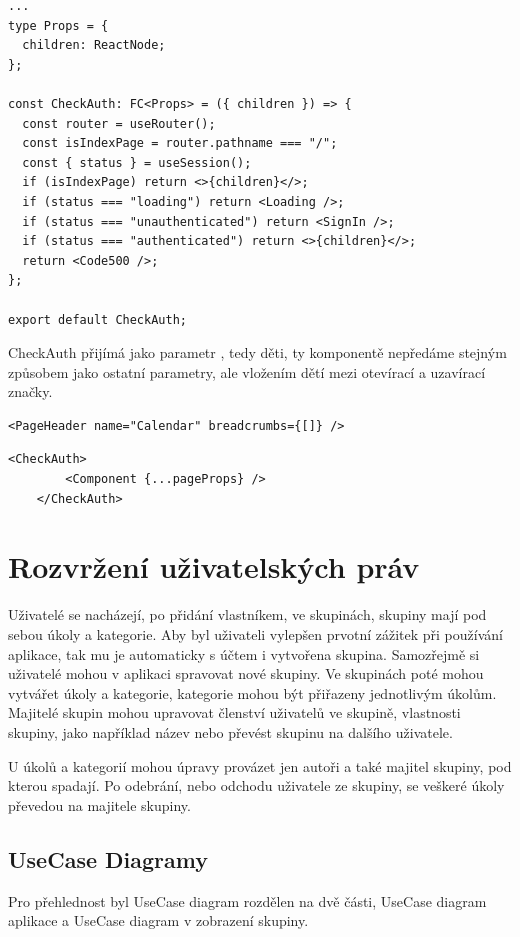 \begin{lstlisting}[caption=Komponenta CheckAuth]
...
type Props = {
  children: ReactNode;
};

const CheckAuth: FC<Props> = ({ children }) => {
  const router = useRouter();
  const isIndexPage = router.pathname === "/";
  const { status } = useSession();
  if (isIndexPage) return <>{children}</>;
  if (status === "loading") return <Loading />;
  if (status === "unauthenticated") return <SignIn />;
  if (status === "authenticated") return <>{children}</>;
  return <Code500 />;
};

export default CheckAuth;

\end{lstlisting}
CheckAuth přijímá jako parametr , tedy děti, ty komponentě nepředáme stejným způsobem jako ostatní parametry, ale vložením dětí mezi otevírací a uzavírací značky.
\begin{lstlisting}[caption=Standardní předání parametrů komponentě]
    <PageHeader name="Calendar" breadcrumbs={[]} />
\end{lstlisting}
\begin{lstlisting}[caption=Předání dětí komponentě]
    <CheckAuth>
        <Component {...pageProps} />
    </CheckAuth>
\end{lstlisting}
\section{Rozvržení uživatelských práv}
Uživatelé se nacházejí, po přidání vlastníkem, ve skupinách, skupiny mají pod sebou úkoly a kategorie. Aby byl uživateli vylepšen prvotní zážitek při používání aplikace, tak mu je automaticky s účtem i vytvořena skupina. Samozřejmě si uživatelé mohou v aplikaci spravovat nové skupiny. Ve skupinách poté mohou vytvářet úkoly a kategorie, kategorie mohou být přiřazeny jednotlivým úkolům. Majitelé skupin mohou upravovat členství uživatelů ve skupině, vlastnosti skupiny, jako například název nebo převést skupinu na dalšího uživatele. 

U úkolů a kategorií mohou úpravy provázet jen autoři a také majitel skupiny, pod kterou spadají. Po odebrání, nebo odchodu uživatele ze skupiny, se veškeré úkoly převedou na majitele skupiny. 
\newpage
\subsection{UseCase Diagramy}
Pro přehlednost byl UseCase diagram rozdělen na dvě části, UseCase diagram aplikace a UseCase diagram v zobrazení skupiny.

